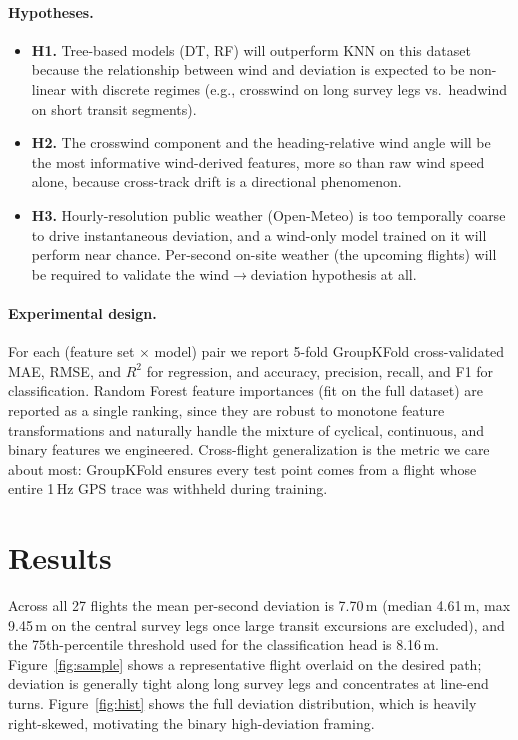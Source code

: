 \documentclass[10pt]{article}
\begin{document}
\paragraph{Hypotheses.}
\begin{itemize}
  \item \textbf{H1.} Tree-based models (DT, RF) will outperform KNN on this dataset because the relationship between wind and deviation is expected to be non-linear with discrete regimes (e.g., crosswind on long survey legs vs.\ headwind on short transit segments).
  \item \textbf{H2.} The crosswind component and the heading-relative wind angle will be the most informative wind-derived features, more so than raw wind speed alone, because cross-track drift is a directional phenomenon.
  \item \textbf{H3.} Hourly-resolution public weather (Open-Meteo) is too temporally coarse to drive instantaneous deviation, and a wind-only model trained on it will perform near chance. Per-second on-site weather (the upcoming flights) will be required to validate the wind$\rightarrow$deviation hypothesis at all.
\end{itemize}

\paragraph{Experimental design.} For each (feature set $\times$ model) pair we report 5-fold GroupKFold cross-validated MAE, RMSE, and $R^2$ for regression, and accuracy, precision, recall, and F1 for classification. Random Forest feature importances (fit on the full dataset) are reported as a single ranking, since they are robust to monotone feature transformations and naturally handle the mixture of cyclical, continuous, and binary features we engineered. Cross-flight generalization is the metric we care about most: GroupKFold ensures every test point comes from a flight whose entire 1\,Hz GPS trace was withheld during training.

\section{Results}

Across all 27 flights the mean per-second deviation is 7.70\,m (median 4.61\,m, max 9.45\,m on the central survey legs once large transit excursions are excluded), and the 75th-percentile threshold used for the classification head is 8.16\,m. Figure~\ref{fig:sample} shows a representative flight overlaid on the desired path; deviation is generally tight along long survey legs and concentrates at line-end turns. Figure~\ref{fig:hist} shows the full deviation distribution, which is heavily right-skewed, motivating the binary high-deviation framing.
\end{document}
